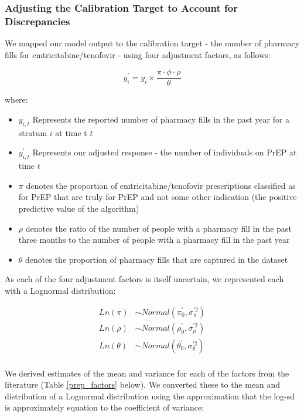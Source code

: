 \documentclass{article}
\begin{document}
\subsubsection{Adjusting the Calibration Target to Account for Discrepancies}

We mapped our model output to the calibration target - the number of pharmacy fills for emtricitabine/tenofovir - using four adjustment factors, as follows:

\begin{equation}
	y^\prime_i = y_i \times \frac{\pi \cdot \phi \cdot \rho}{\theta}
\end{equation}

where:
\begin{itemize}
	\item $y_{i,t}$ Represents the reported number of pharmacy fills in the past year for a stratum $i$ at time t $t$
	\item $y^\prime_{i,t}$ Represents our adjusted response - the number of individuals on PrEP at time $t$
	\item $\pi$ denotes the proportion of emtricitabine/tenofovir prescriptions classified as for PrEP that are truly for PrEP and not some other indication (the positive predictive value of the algorithm)
	\item $\rho$ denotes the ratio of the number of people with a pharmacy fill in the past three months to the number of people with a pharmacy fill in the past year
	\item $\theta$ denotes the proportion of pharmacy fills that are captured in the dataset
\end{itemize}

As each of the four adjustment factors is itself uncertain, we represented each with a Lognormal distribution:

\begin{align*}
	Ln(\pi)& \sim Normal(\pi^\prime_0, \sigma^{\prime 2}_\pi) \\
	Ln(\rho)& \sim Normal(\rho^\prime_0, \sigma^{\prime 2}_\rho) \\
	Ln(\theta)& \sim Normal(\theta^\prime_0, \sigma^{\prime 2}_\theta) \\
\end{align*}

We derived estimates of the mean and variance for each of the factors from the literature (Table \ref{prep_factors} below). We converted these to the mean and distribution of a Lognormal distribution using the approximation that the log-sd is approximately equation to the coefficient of variance:
\end{document}
